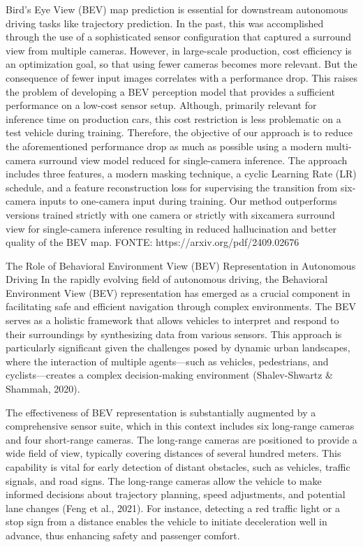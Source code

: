 Bird’s Eye View (BEV) map prediction is essential for downstream autonomous driving tasks like trajectory
prediction. In the past, this was accomplished through the
use of a sophisticated sensor configuration that captured a
surround view from multiple cameras. However, in large-scale
production, cost efficiency is an optimization goal, so that using
fewer cameras becomes more relevant. But the consequence
of fewer input images correlates with a performance drop.
This raises the problem of developing a BEV perception
model that provides a sufficient performance on a low-cost
sensor setup. Although, primarily relevant for inference time
on production cars, this cost restriction is less problematic on
a test vehicle during training. Therefore, the objective of our
approach is to reduce the aforementioned performance drop
as much as possible using a modern multi-camera surround
view model reduced for single-camera inference. The approach
includes three features, a modern masking technique, a cyclic
Learning Rate (LR) schedule, and a feature reconstruction
loss for supervising the transition from six-camera inputs to
one-camera input during training. Our method outperforms
versions trained strictly with one camera or strictly with sixcamera surround view for single-camera inference resulting in
reduced hallucination and better quality of the BEV map.
FONTE:
https://arxiv.org/pdf/2409.02676


The Role of Behavioral Environment View (BEV) Representation in Autonomous Driving
In the rapidly evolving field of autonomous driving, the Behavioral Environment View (BEV) representation has emerged as a crucial component in facilitating safe and efficient navigation through complex environments. The BEV serves as a holistic framework that allows vehicles to interpret and respond to their surroundings by synthesizing data from various sensors. This approach is particularly significant given the challenges posed by dynamic urban landscapes, where the interaction of multiple agents—such as vehicles, pedestrians, and cyclists—creates a complex decision-making environment (Shalev-Shwartz & Shammah, 2020).

The effectiveness of BEV representation is substantially augmented by a comprehensive sensor suite, which in this context includes six long-range cameras and four short-range cameras. The long-range cameras are positioned to provide a wide field of view, typically covering distances of several hundred meters. This capability is vital for early detection of distant obstacles, such as vehicles, traffic signals, and road signs. The long-range cameras allow the vehicle to make informed decisions about trajectory planning, speed adjustments, and potential lane changes (Feng et al., 2021). For instance, detecting a red traffic light or a stop sign from a distance enables the vehicle to initiate deceleration well in advance, thus enhancing safety and passenger comfort.

